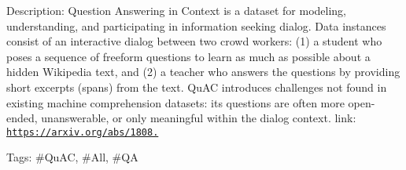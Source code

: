 Description\+: Question Answering in Context is a dataset for modeling, understanding, and participating in information seeking dialog. Data instances consist of an interactive dialog between two crowd workers\+: (1) a student who poses a sequence of freeform questions to learn as much as possible about a hidden Wikipedia text, and (2) a teacher who answers the questions by providing short excerpts (spans) from the text. Qu\+AC introduces challenges not found in existing machine comprehension datasets\+: its questions are often more open-\/ended, unanswerable, or only meaningful within the dialog context. link\+: \href{https://arxiv.org/abs/1808.07036}{\tt https\+://arxiv.\+org/abs/1808.}

Tags\+: \#\+Qu\+AC, \#\+All, \#\+QA 